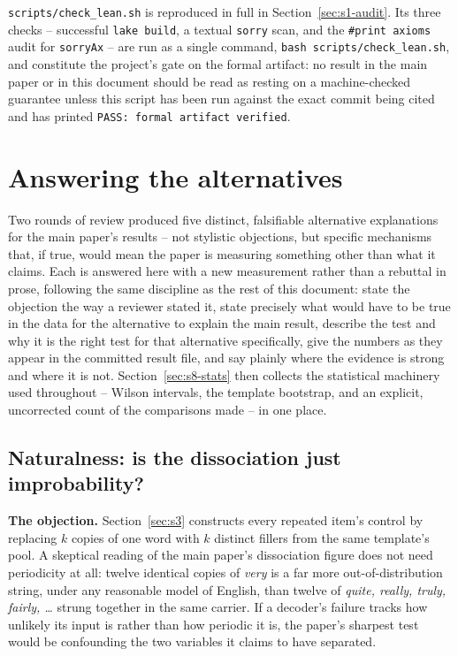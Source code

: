 \documentclass[11pt]{article}
\begin{document}
\texttt{scripts/check\_lean.sh} is reproduced in full in
Section~\ref{sec:s1-audit}. Its three checks -- successful \texttt{lake
build}, a textual \texttt{sorry} scan, and the \texttt{\#print axioms} audit
for \texttt{sorryAx} -- are run as a single command,
\texttt{bash scripts/check\_lean.sh}, and constitute the project's gate on
the formal artifact: no result in the main paper or in this document should
be read as resting on a machine-checked guarantee unless this script has
been run against the exact commit being cited and has printed
\texttt{PASS: formal artifact verified}.

\section{Answering the alternatives}
\label{sec:s8}

Two rounds of review produced five distinct, falsifiable alternative
explanations for the main paper's results -- not stylistic objections, but
specific mechanisms that, if true, would mean the paper is measuring
something other than what it claims. Each is answered here with a new
measurement rather than a rebuttal in prose, following the same discipline as
the rest of this document: state the objection the way a reviewer stated it,
state precisely what would have to be true in the data for the alternative to
explain the main result, describe the test and why it is the right test for
that alternative specifically, give the numbers as they appear in the
committed result file, and say plainly where the evidence is strong and where
it is not. Section~\ref{sec:s8-stats} then collects the statistical
machinery used throughout -- Wilson intervals, the template bootstrap, and an
explicit, uncorrected count of the comparisons made -- in one place.

\subsection{Naturalness: is the dissociation just improbability?}
\label{sec:s8-natural}

\textbf{The objection.} Section~\ref{sec:s3} constructs every repeated item's
control by replacing $k$ copies of one word with $k$ distinct fillers from the
same template's pool. A skeptical reading of the main paper's
dissociation figure does not need periodicity at all: twelve identical
copies of \emph{very} is a far more out-of-distribution string, under any
reasonable model of English, than twelve of \emph{quite, really, truly,
fairly, \dots} strung together in the same carrier. If a decoder's failure
tracks how unlikely its input is rather than how periodic it is, the paper's
sharpest test would be confounding the two variables it claims to have
separated.
\end{document}
